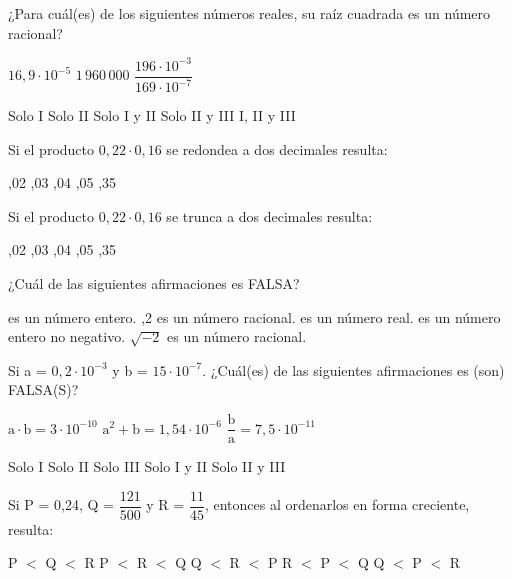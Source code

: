 \documentclass[pagina vacia]{srs}
\begin{document}
\begin{preguntas}[after-item-skip=1cm]
\pregunta ¿Para cuál(es) de los siguientes números reales, su raíz cuadrada es un número racional?
\begin{verticali}
\alternativa \(16,9 \cdot 10^{-5}\)
\alternativa \(1\,960\,000\)
\alternativa \(\dfrac{196 \cdot 10^{-3}}{169 \cdot 10^{-7}}\)
\end{verticali}
\begin{vertical}
\alternativa Solo I
\alternativa Solo II
\alternativa Solo I y II
\alternativa Solo II y III
\alternativa I, II y III
\end{vertical}

\pregunta Si el producto \(0,22 \cdot 0,16\) se redondea a dos decimales resulta:
\begin{vertical}
,02
,03
,04
,05
,35
\end{vertical}

\pregunta Si el producto \(0,22 \cdot 0,16\) se trunca a dos decimales resulta:
\begin{vertical}
,02
,03
,04
,05
,35
\end{vertical}


\pregunta ¿Cuál de las siguientes afirmaciones es FALSA?
\begin{vertical}
 es un número entero.
,2 es un número racional.
 es un número real.
 es un número entero no negativo.
\alternativa \( \sqrt{-2} \) es un número racional.
\end{vertical}

\pregunta Si a = \(0,2 \cdot 10^{-3}\) y b = \(15 \cdot 10^{-7}\). ¿Cuál(es) de las siguientes afirmaciones es (son) FALSA(S)?
\begin{verticali}
\alternativa \( \text{a} \cdot \text{b} = 3 \cdot 10^{-10} \)
\alternativa \( \text{a}^2 + \text{b} = 1,54 \cdot 10^{-6} \)
\alternativa \( \dfrac{\text{b}}{\text{a}} = 7,5 \cdot 10^{-11} \)
\end{verticali}
\begin{vertical}
\alternativa Solo I
\alternativa Solo II
\alternativa Solo III
\alternativa Solo I y II
\alternativa Solo II y III
\end{vertical}

\pregunta Si P = 0,24, Q = \( \dfrac{121}{500} \) y R = \( \dfrac{11}{45} \), entonces al ordenarlos en forma creciente, resulta:
\begin{vertical}
\alternativa P \(<\) Q \(<\) R
\alternativa P \(<\) R \(<\) Q
\alternativa Q \(<\) R \(<\) P
\alternativa R \(<\) P \(<\) Q
\alternativa Q \(<\) P \(<\) R
\end{vertical}


\end{preguntas}
\end{document}
